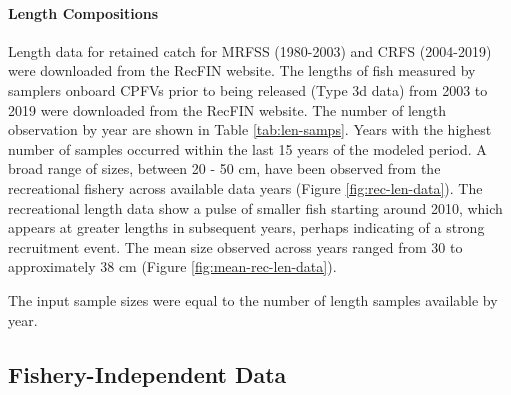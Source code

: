 \documentclass[11pt,
  english,
  a4paper,
]{article}
\begin{document}
\leavevmode\tagmcend\tagstructend\par


\hypertarget{length-compositions-1}{%
\paragraph{Length Compositions}\label{length-compositions-1}}

\leavevmode\tagmcend\tagstructend


Length data for retained catch for MRFSS (1980-2003) and CRFS (2004-2019) were downloaded from the RecFIN website. The lengths of fish measured by samplers onboard CPFVs prior to being released (Type 3d data) from 2003 to 2019 were downloaded from the RecFIN website. The number of length observation by year are shown in Table \ref{tab:len-samps}. Years with the highest number of samples occurred within the last 15 years of the modeled period. A broad range of sizes, between 20 - 50 cm, have been observed from the recreational fishery across available data years (Figure \ref{fig:rec-len-data}). The recreational length data show a pulse of smaller fish starting around 2010, which appears at greater lengths in subsequent years, perhaps indicating of a strong recruitment event. The mean size observed across years ranged from 30 to approximately 38 cm (Figure \ref{fig:mean-rec-len-data}).

\leavevmode\tagmcend\tagstructend\par


The input sample sizes were equal to the number of length samples available by year.

\leavevmode\tagmcend\tagstructend\par


\hypertarget{fishery-independent-data}{%
\subsection{Fishery-Independent Data}\label{fishery-independent-data}}

\leavevmode\tagmcend\tagstructend

\end{document}
